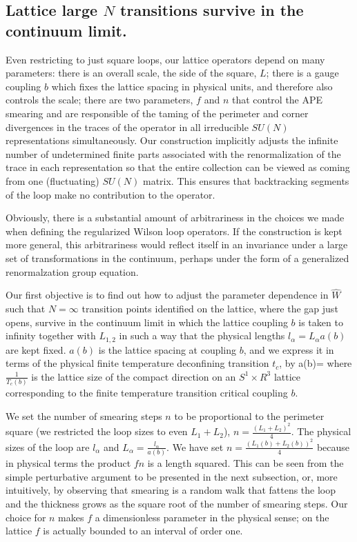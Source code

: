 \subsection{Lattice large $N$ transitions survive in the continuum limit.}

Even restricting to just square loops, our lattice operators
depend on many parameters: there is an overall scale, the side of
the square, $L$; there is a gauge coupling $b$ which fixes the
lattice spacing in physical units, and therefore also controls the
scale; there are two parameters, $f$ and $n$ that control the APE
smearing and are responsible of the taming of the perimeter and
corner divergences in the traces of the operator in all
irreducible $SU(N)$ representations simultaneously. Our
construction implicitly adjusts the infinite number of
undetermined finite parts associated with the renormalization of
the trace in each representation so that the entire collection can
be viewed as coming from one (fluctuating) $SU(N)$ matrix. This
ensures that backtracking segments of the loop make no
contribution to the operator.

Obviously, there is a substantial amount of arbitrariness in the
choices we made when defining the regularized Wilson loop
operators. If the construction is kept more general, this
arbitrariness would reflect itself in an invariance under a large
set of transformations in the continuum, perhaps under the form of
a generalized renormalzation group equation.

Our first objective is to find out how to adjust the parameter
dependence in $\hat W$ such that $N=\infty$ transition points
identified on the lattice, where the gap just opens, survive in
the continuum limit in which the lattice coupling $b$ is taken to
infinity together with $L_{1,2}$ in such a way that the physical
lengths $l_\alpha = L_\alpha a(b)$ are kept fixed. $a(b)$ is the
lattice spacing at coupling $b$, and we express it in terms of the
physical finite temperature deconfining transition $t_c$, by
\be
a(b)=
\ee
where $\frac{1}{T_c(b)}$ is the lattice
size of the compact direction on an $S^1\times R^3$ lattice
corresponding to the finite temperature transition critical
coupling $b$.

We set the number of smearing steps $n$ to be proportional to the
perimeter square (we restricted the loop sizes to even
$L_1+L_2$), $n=\frac{(L_1+L_2)^2}{4}$. The physical
sizes of the loop are $l_\alpha$ and $L_\alpha = \frac{l_\alpha}{a(b)}$.
We have
set $n=\frac{(L_1 (b) + L_2 (b))^2}{4}$ because in physical terms
the product $f n$ is a length squared. This can be seen from the
simple perturbative argument to be presented in
the next subsection, or, more
intuitively, by observing that smearing is a random walk that
fattens the loop and the thickness grows as the square root of the
number of smearing steps. Our choice for $n$ makes $f$ a
dimensionless parameter in the physical sense; on the lattice $f$
is actually bounded to an interval of order one.

